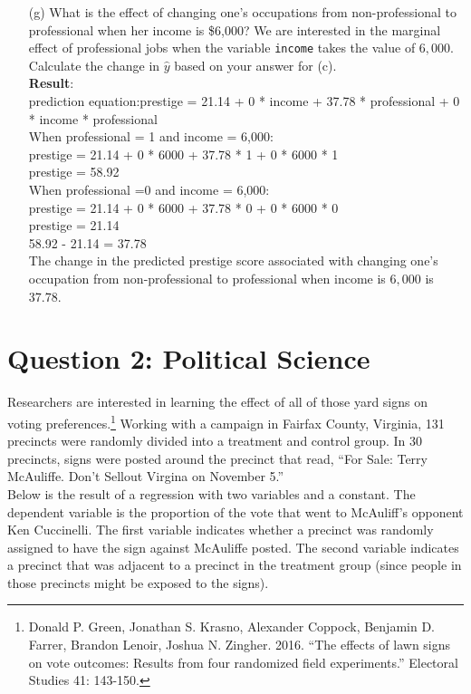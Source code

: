 \documentclass[12pt,letterpaper]{article}
\begin{document}
\begin{enumerate}
	
	\item [(g)]
	What is the effect of changing one's occupations from non-professional to professional when her income is \$6,000? We are interested in the marginal effect of professional jobs when the variable \texttt{income} takes the value of $6,000$. Calculate the change in $\hat{y}$ based on your answer for (c).
	\vspace{.25cm}\\
	\textbf{Result}:\\
	prediction equation:prestige = 21.14 + 0 * income + 37.78 * professional + 0 * income * professional\\
	When professional = 1 and income = 6,000:\\
	prestige = 21.14 + 0 * 6000 + 37.78 * 1 + 0 * 6000 * 1\\
	prestige = 58.92\\
	When professional =0 and income = 6,000:\\
	prestige = 21.14 + 0 * 6000 + 37.78 * 0 + 0 * 6000 * 0\\
	prestige = 21.14\\
	58.92 - 21.14 = 37.78\\
	The change in the predicted prestige score associated with changing one's occupation from non-professional to professional when income is $6,000$ is 37.78.\\
	
	
\end{enumerate}

\newpage

\section*{Question 2: Political Science}
\vspace{.25cm}
\noindent 	Researchers are interested in learning the effect of all of those yard signs on voting preferences.\footnote{Donald P. Green, Jonathan	S. Krasno, Alexander Coppock, Benjamin D. Farrer,	Brandon Lenoir, Joshua N. Zingher. 2016. ``The effects of lawn signs on vote outcomes: Results from four randomized field experiments.'' Electoral Studies 41: 143-150. } Working with a campaign in Fairfax County, Virginia, 131 precincts were randomly divided into a treatment and control group. In 30 precincts, signs were posted around the precinct that read, ``For Sale: Terry McAuliffe. Don't Sellout Virgina on November 5.'' \\

Below is the result of a regression with two variables and a constant.  The dependent variable is the proportion of the vote that went to McAuliff's opponent Ken Cuccinelli. The first variable indicates whether a precinct was randomly assigned to have the sign against McAuliffe posted. The second variable indicates
a precinct that was adjacent to a precinct in the treatment group (since people in those precincts might be exposed to the signs).  \\
\end{document}
